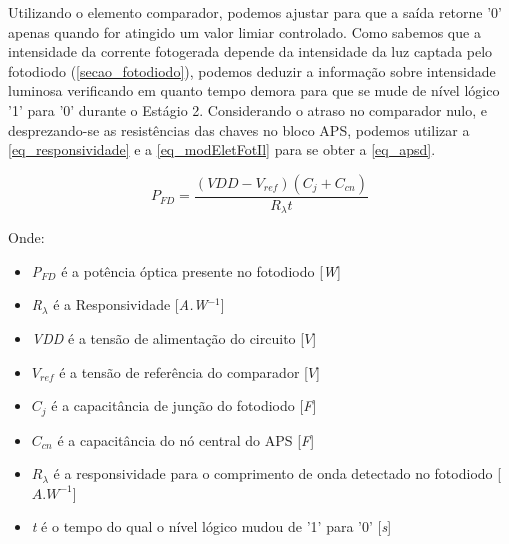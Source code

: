 Utilizando o elemento comparador, podemos ajustar para que a sa\'ida retorne '0' apenas quando for atingido um valor limiar controlado. Como sabemos que a intensidade da corrente fotogerada depende da intensidade da luz captada pelo fotodiodo (\autoref{secao_fotodiodo}), podemos deduzir a informação sobre intensidade luminosa verificando em quanto tempo demora para que se mude de n\'ivel l\'ogico '1' para '0' durante o Est\'agio 2. Considerando o atraso no comparador nulo, e desprezando-se as resistências das chaves no bloco APS, podemos utilizar a \autoref{eq_responsividade} e a \autoref{eq_modEletFotIl} para se obter a \autoref{eq_apsd}.

\begin{equation}
    \label{eq_apsd}
    P_{FD} = \frac{(VDD-V_{ref})(C_{j}+C_{cn})}{R_{\lambda}t}
\end{equation}

Onde:

\begin{itemize}

    \item \textit{P$_{FD}$} \'e a pot\^encia \'optica presente no fotodiodo [\textit{W}]
    \item \textit{R$_\lambda$} \'e a Responsividade [\textit{A.W$^{-1}$}]
    \item \textit{VDD} \'e a tensão de alimentação do circuito [$V$]
    \item \textit{$V_{ref}$} \'e a tensão de refer\^encia do comparador [$V$]
    \item \textit{$C_j$} \'e a capacit\^ancia de junção do fotodiodo [\textit{F}]
    \item \textit{$C_{cn}$} \'e a capacit\^ancia do n\'o central do APS [\textit{F}]
    \item $R_{\lambda}$ \'e a responsividade para o comprimento de onda detectado no fotodiodo [$A.W^{-1}$]
    \item \textit{t} \'e o tempo do qual o n\'ivel l\'ogico mudou de '1' para '0' [\textit{s}]
    
\end{itemize}